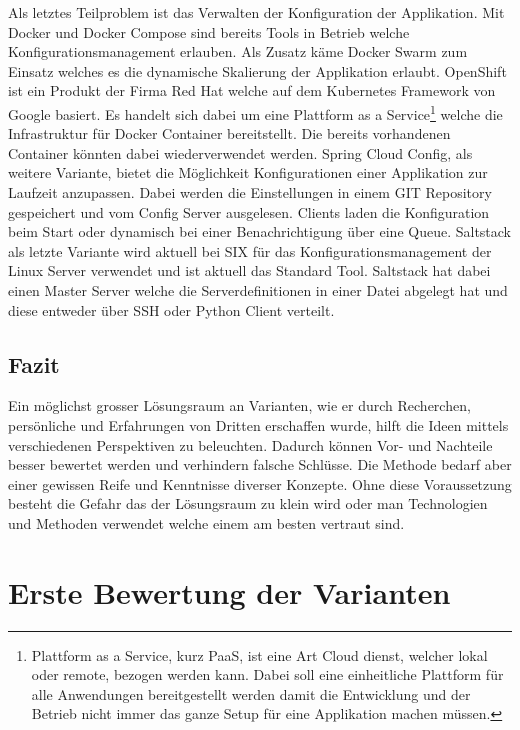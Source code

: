 Als letztes Teilproblem ist das Verwalten der Konfiguration der Applikation. Mit Docker und Docker Compose sind bereits Tools in Betrieb welche Konfigurationsmanagement erlauben. Als Zusatz käme Docker Swarm zum Einsatz welches es die dynamische Skalierung der Applikation erlaubt.\newline
OpenShift ist ein Produkt der Firma Red Hat welche auf dem Kubernetes Framework von Google basiert. Es handelt sich dabei um eine Plattform as a Service\footnote{Plattform as a Service, kurz PaaS, ist eine Art Cloud dienst, welcher lokal oder remote, bezogen werden kann. Dabei soll eine einheitliche Plattform für alle Anwendungen bereitgestellt werden damit die Entwicklung und der Betrieb nicht immer das ganze Setup für eine Applikation machen müssen.} welche die Infrastruktur für Docker Container bereitstellt. Die bereits vorhandenen Container könnten dabei wiederverwendet werden.\newline
Spring Cloud Config, als weitere Variante, bietet die Möglichkeit Konfigurationen einer Applikation zur Laufzeit anzupassen. Dabei werden die Einstellungen in einem GIT Repository gespeichert und vom Config Server ausgelesen. Clients laden die Konfiguration beim Start oder dynamisch bei einer Benachrichtigung über eine Queue.
Saltstack als letzte Variante wird aktuell bei SIX für das Konfigurationsmanagement der Linux Server verwendet und ist aktuell das Standard Tool. Saltstack hat dabei einen Master Server welche die Serverdefinitionen in einer Datei abgelegt hat und diese entweder über SSH oder Python Client verteilt.

\subsection{Fazit}

Ein möglichst grosser Lösungsraum an Varianten, wie er durch Recherchen, persönliche und Erfahrungen von Dritten erschaffen wurde, hilft die Ideen mittels verschiedenen Perspektiven zu beleuchten. Dadurch können Vor- und Nachteile besser bewertet werden und verhindern falsche Schlüsse. Die Methode bedarf aber einer gewissen Reife und Kenntnisse diverser Konzepte. Ohne diese Voraussetzung besteht die Gefahr das der Lösungsraum zu klein wird oder man Technologien und Methoden verwendet welche einem am besten vertraut sind.

\section{Erste Bewertung der Varianten}

